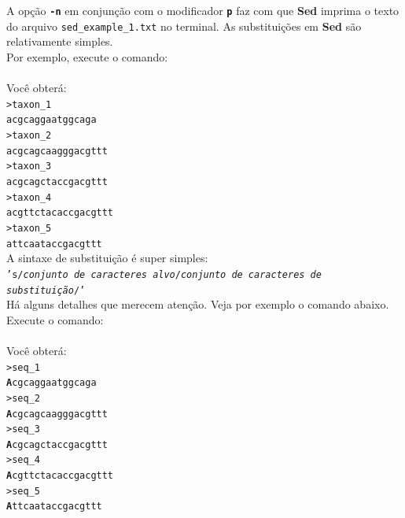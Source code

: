 \begin{refsection}
A opção \texttt{\textbf{-n}} em conjunção com o modificador \texttt{\textbf{p}} faz com que \textbf{Sed} imprima o texto do arquivo \texttt{sed\_example\_1.txt} no terminal. As substituições em \textbf{Sed} são relativamente simples.\\

Por exemplo, execute o comando:\\
\\

Você obterá:\\
\texttt{>taxon\_1}\\
\texttt{acgcaggaatggcaga}\\
\texttt{>taxon\_2}\\
\texttt{acgcagcaagggacgttt}\\
\texttt{>taxon\_3}\\
\texttt{acgcagctaccgacgttt}\\
\texttt{>taxon\_4}\\
\texttt{acgttctacaccgacgttt}\\
\texttt{>taxon\_5}\\
\texttt{attcaataccgacgttt}\\

A sintaxe de substituição é super simples:\\
 \texttt{'s/\textit{conjunto de caracteres alvo}/\textit{conjunto de caracteres de substituição}/'}\\

Há alguns detalhes que merecem atenção. Veja por exemplo o comando abaixo.\\

Execute o comando:\\
\\

Você obterá:\\
\texttt{>seq\_1}\\
\texttt{\textbf{A}cgcaggaatggcaga}\\
\texttt{>seq\_2}\\
\texttt{\textbf{A}cgcagcaagggacgttt}\\
\texttt{>seq\_3}\\
\texttt{\textbf{A}cgcagctaccgacgttt}\\
\texttt{>seq\_4}\\
\texttt{\textbf{A}cgttctacaccgacgttt}\\
\texttt{>seq\_5}\\
\texttt{\textbf{A}ttcaataccgacgttt}\\


\end{refsection}
